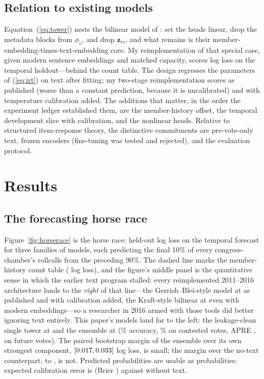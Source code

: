 \documentclass[12pt]{article}
\begin{document}
\subsection{Relation to existing models}
\label{sec:relation}

Equation~(\ref{eq:tower}) nests the bilinear model of
\citet{kraft2016embedding}: set the heads linear, drop the metadata
blocks from $\phi_v$, and drop $\mathbf{z}_{iv}$, and what remains is
their member-embedding-times-text-embedding core. My reimplementation
of that special case, given modern sentence embeddings and matched
capacity, scores \kraftForecastLL{} log loss on the temporal
holdout---behind the \memberqForecastLL{} count table. The
\citet{gerrish2011predicting} design regresses the parameters of
(\ref{eq:irt}) on text after fitting; my two-stage reimplementation
scores \gbRawForecastLL{} as published (worse than a constant
prediction, because it is uncalibrated) and \gbTcalForecastLL{} with
temperature calibration added. The additions that matter, in the order
the experiment ledger established them, are the member-history offset,
the temporal development slice with calibration, and the nonlinear
heads. Relative to structured item-response theory, the distinctive
commitments are pre-vote-only text, frozen encoders (fine-tuning was
tested and rejected), and the evaluation protocol.

\section{Results}
\label{sec:results}

\subsection{The forecasting horse race}

Figure~\ref{fig:horserace} is the horse race: held-out log loss on the
temporal forecast for three families of models, each predicting the
final 10\% of every congress-chamber's rollcalls from the preceding
90\%. The dashed line marks the member-history count table
(\memberqForecastLL{} log loss), and the figure's middle panel is the
quantitative sense in which the earlier text program stalled: every
reimplemented 2011--2016 architecture lands to the \emph{right} of that
line---the Gerrish--Blei-style model at \gbRawForecastLL{} as published
and \gbTcalForecastLL{} with calibration added, the Kraft-style
bilinear at \kraftForecastLL{} even with modern embeddings---so a
researcher in 2016 armed with those tools did better ignoring text
entirely. This paper's models land far to the left: the leakage-clean
single tower at \incForecastLL{} and the ensemble at \champForecastLL{}
(\champForecastAcc\% accuracy, \champContestedAcc\% on contested votes,
APRE \champAPRE, on \forecastTestN{} future votes). The paired
bootstrap margin of the ensemble over its own strongest component,
$[0.017, 0.033]$ log loss, is small; the margin
over the no-text counterpart, \notextForecastLL{} to \champForecastLL,
is not. Predicted probabilities are usable as probabilities: expected
calibration error is \eceChamp{} (Brier \brierChamp) against
\eceNotext{} without text.
\end{document}
